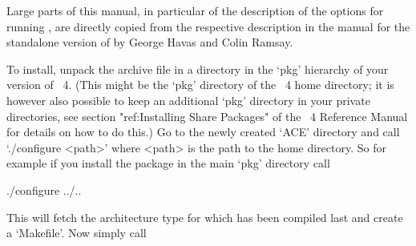 %







Large parts of  this manual, in particular of  the description of the
options for  running {\ACE}, are  directly copied from  the respective
description in  the manual \cite{HR99a} for the  standalone version of
{\ACE} by George Havas and Colin Ramsay.





To  install, unpack  the  archive file  in  a directory  in the  `pkg'
hierarchy  of your  version  of  {\GAP}~4. (This  might  be the  `pkg'
directory of the {\GAP}~4 home  directory; it is however also possible
to keep an additional `pkg' directory in your private directories, see
section  "ref:Installing  Share Packages"  of  the {\GAP}~4  Reference
Manual for details  on how to do this.) Go to  the newly created `ACE'
directory and  call `./configure <path>'  where <path> is the  path to
the {\GAP} home  directory. So for example if  you install the package
in the main `pkg' directory call

\begintt
./configure ../..
\endtt

This  will fetch  the  architecture  type for  which  {\GAP} has  been
compiled last and create a `Makefile'. Now simply call

